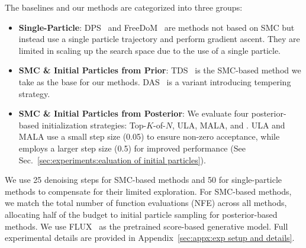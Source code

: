 The baselines and our methods are categorized into three groups:
\begin{itemize}[leftmargin=15pt]
    \vspace{-0.2cm}
    \item \textbf{Single-Particle}: DPS~\cite{chung2023dps} and FreeDoM~\cite{yu2023freedom} are methods not based on SMC but instead use a single particle trajectory and perform gradient ascent. They are limited in scaling up the search space due to the use of a single particle.
    \item \textbf{SMC \& Initial Particles from Prior}: TDS~\cite{wu2023tds} is the SMC-based method we take as the base for our methods. DAS~\cite{kim2025DAS} is a variant introducing tempering  strategy.
    \item \textbf{SMC \& Initial Particles from Posterior}: We evaluate four posterior-based initialization strategies: Top-$K$-of-$N$, ULA, MALA, and \methodname{}. ULA and MALA use a small step size (0.05) to ensure non-zero acceptance, while \methodname{} employs a larger step size (0.5) for improved performance (See Sec.~\ref{sec:experiments:ealuation of initial particles}).
\end{itemize}
\vspace{-0.2cm}
We use 25 denoising steps for SMC-based methods and 50 for single-particle methods to compensate for their limited exploration. For SMC-based methods, we match the total number of function evaluations (NFE) across all methods, allocating half of the budget to initial particle sampling for posterior-based methods. We use FLUX~\cite{BlackForestLabs:2024Flux} as the pretrained score-based generative model. Full experimental details are provided in Appendix~\ref{sec:appx:exp setup and details}.

